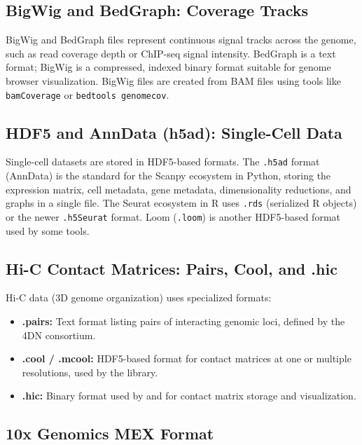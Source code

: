 \subsection{BigWig and BedGraph: Coverage Tracks}
\label{subsec:bioinf:bigwig}

BigWig and BedGraph files represent continuous signal tracks across the genome, such as read coverage depth or ChIP-seq signal intensity. BedGraph is a text format; BigWig is a compressed, indexed binary format suitable for genome browser visualization. BigWig files are created from BAM files using tools like  \texttt{bamCoverage} or \texttt{bedtools genomecov}.

\subsection{HDF5 and AnnData (h5ad): Single-Cell Data}
\label{subsec:bioinf:h5ad}

Single-cell datasets are stored in HDF5-based formats. The \texttt{.h5ad} format (AnnData) is the standard for the Scanpy ecosystem in Python, storing the expression matrix, cell metadata, gene metadata, dimensionality reductions, and graphs in a single file. The Seurat ecosystem in R uses \texttt{.rds} (serialized R objects) or the newer \texttt{.h5Seurat} format. Loom (\texttt{.loom}) is another HDF5-based format used by some tools.

\subsection{Hi-C Contact Matrices: Pairs, Cool, and .hic}
\label{subsec:bioinf:hic}

Hi-C data (3D genome organization) uses specialized formats:
\begin{itemize}[itemsep=2pt]
  \item \textbf{.pairs:} Text format listing pairs of interacting genomic loci, defined by the 4DN consortium.
  \item \textbf{.cool / .mcool:} HDF5-based format for contact matrices at one or multiple resolutions, used by the  library.
  \item \textbf{.hic:} Binary format used by  and  for contact matrix storage and visualization.
\end{itemize}

\subsection{10x Genomics MEX Format}
\label{subsec:bioinf:10x}

